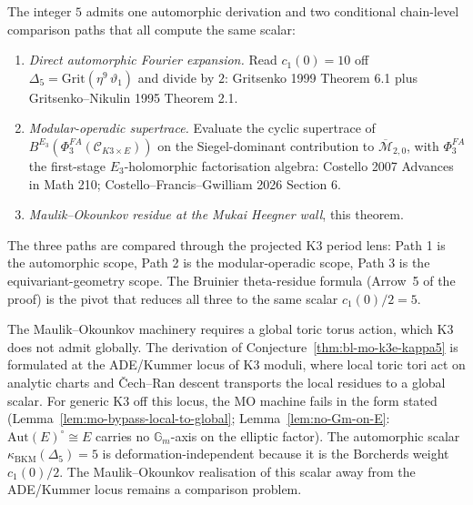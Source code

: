 \begin{remark}[Three paths to $\kappa_{\mathrm{BKM}}^{(N=1)} = 5$]
\label{rem:bl-mo-three-paths}
The integer $5$ admits one automorphic derivation and two conditional chain-level comparison paths that
all compute the same scalar:
\begin{enumerate}
\item[(P1)] \emph{Direct automorphic Fourier expansion.} Read
$c_{1}(0) = 10$ off $\Delta_{5} = \mathrm{Grit}(\eta^{9}\,\vartheta_{1})$
and divide by $2$: Gritsenko 1999 Theorem 6.1 plus
Gritsenko--Nikulin 1995 Theorem 2.1.
\item[(P2)] \emph{Modular-operadic supertrace.} Evaluate the cyclic
supertrace of $B^{E_{3}}(\Phi^{FA}_{3}(\mathcal{C}_{K3 \times E}))$
on the Siegel-dominant contribution to $\overline{\mathcal{M}}_{2, 0}$,
with $\Phi^{FA}_{3}$ the first-stage $E_{3}$-holomorphic
factorisation algebra: Costello 2007 Advances in Math 210;
Costello--Francis--Gwilliam 2026 Section 6.
\item[(P3)] \emph{Maulik--Okounkov residue at the Mukai Heegner wall},
this theorem.
\end{enumerate}
The three paths are compared through the projected K3 period lens: Path 1 is the automorphic scope,
Path 2 is the modular-operadic scope, Path 3 is the
equivariant-geometry scope. The Bruinier theta-residue formula
(Arrow~5 of the proof) is the pivot that reduces all three to the
same scalar $c_{1}(0)/2 = 5$.
\end{remark}

\begin{remark}
\label{rem:bl-mo-k3e-scope}
The Maulik--Okounkov machinery requires a global toric torus action,
which K3 does not admit globally. The derivation of
Conjecture~\ref{thm:bl-mo-k3e-kappa5} is formulated at the ADE/Kummer locus
of K3 moduli, where local toric tori act on analytic charts and
\v{C}ech--Ran descent transports the local residues to a global
scalar. For generic K3 off this locus, the MO machine fails in the
form stated (Lemma~\ref{lem:mo-bypass-local-to-global};
Lemma~\ref{lem:no-Gm-on-E}: $\mathrm{Aut}(E)^{\circ} \cong E$ carries no
$\mathbb{G}_{m}$-axis on the elliptic factor). The automorphic scalar
\(\kappa_{\mathrm{BKM}}(\Delta_5)=5\) is deformation-independent because it is the Borcherds weight \(c_1(0)/2\). The Maulik--Okounkov realisation of this scalar away from the ADE/Kummer locus remains a comparison problem.
\end{remark}

